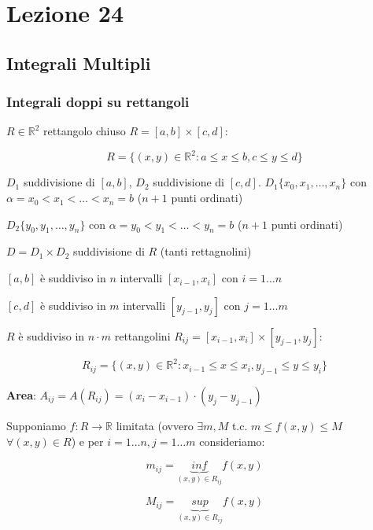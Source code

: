 \documentclass[../appunti-analisi.tex]{subfiles}
\begin{document}
\section{Lezione 24}

\subsection{Integrali Multipli}

\subsubsection{Integrali doppi su rettangoli}


$R \in \mathbb{R}^{2}$ rettangolo chiuso $R = [a,b]\times [c,d]$:

\[
    R = \{(x,y) \in \mathbb{R}^{2}: a \le x \le b, c \le y \le d \}
\]

$D_1$ suddivisione di $[a,b]$, $D_2$ suddivisione di $[c,d]$.
$D_1 \{x_0,x_1,\ldots,x_n\}$ con $\alpha = x_0 < x_1 < \ldots < x_n = b$ ($n+1$ punti ordinati)

$D_2 \{y_0,y_1,\ldots,y_n\}$ con $\alpha = y_0 < y_1 < \ldots < y_n = b$ ($n+1$ punti ordinati)


$D = D_1 \times D_2$ suddivisione di $R$ (tanti rettagnolini)

$[a,b]$ è suddiviso in $n$ intervalli $[x_{i-1}, x_i]$ con $i = 1 \ldots n$

$[c,d]$ è suddiviso in $m$ intervalli $[y_{j-1}, y_j]$ con $j = 1 \ldots m$

$R$ è suddiviso in $n\cdot m$ rettangolini $R_{ij} = [x_{i-1}, x_i] \times [y_{j-1}, y_j]$:

\[
    R_{ij} = \{(x,y) \in \mathbb{R}^{2}: x_{i-1} \le x \le x_i, y_{j-1} \le  y \le y_i\}
\]

\textbf{Area}: $A_{ij} = A(R_{ij}) = (x_i - x_{i-1}) \cdot (y_j - y_{j-1})$


\newpage 

Supponiamo $f: R \rightarrow \mathbb{R}$ limitata (ovvero $\exists m,M$ t.c. $m \le f(x,y) \le M$ $\forall (x,y) \in R$) e per $i=1 \ldots n, j= 1 \ldots m$ consideriamo:

\[
    m_{ij} = \underbrace{inf}_\text{$(x,y) \in R_{ij}$} f(x,y)
\]

\[
    M_{ij} = \underbrace{sup}_\text{$(x,y) \in R_{ij}$} f(x,y)
\]
\end{document}
